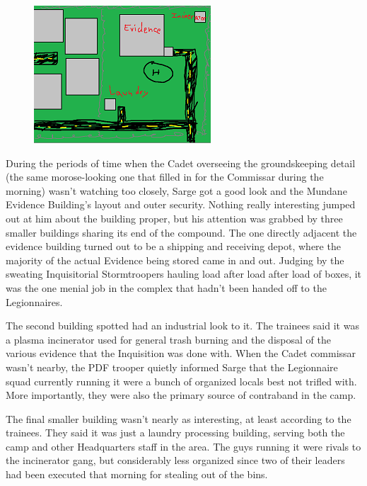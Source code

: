 \begin{figure}
	\begin{center}
		\includegraphics[width=\figwidth]{pics/21/21.png}
	\end{center}
\end{figure}
During the periods of time when the Cadet overseeing the groundskeeping detail (the same morose-looking one that filled in for the Commissar during the morning) wasn't watching too closely, Sarge got a good look and the Mundane Evidence Building's layout and outer security. 
Nothing really interesting jumped out at him about the building proper, but his attention was grabbed by three smaller buildings sharing its end of the compound. 
The one directly adjacent the evidence building turned out to be a shipping and receiving depot, where the majority of the actual Evidence being stored came in and out. 
Judging by the sweating Inquisitorial Stormtroopers hauling load after load after load of boxes, it was the one menial job in the complex that hadn't been handed off to the Legionnaires.

The second building spotted had an industrial look to it. 
The trainees said it was a plasma incinerator used for general trash burning and the disposal of the various evidence that the Inquisition was done with. 
When the Cadet commissar wasn't nearby, the PDF trooper quietly informed Sarge that the Legionnaire squad currently running it were a bunch of organized locals best not trifled with. 
More importantly, they were also the primary source of contraband in the camp. 


The final smaller building wasn't nearly as interesting, at least according to the trainees. 
They said it was just a laundry processing building, serving both the camp and other Headquarters staff in the area. 
The guys running it were rivals to the incinerator gang, but considerably less organized since two of their leaders had been executed that morning for stealing out of the bins.

